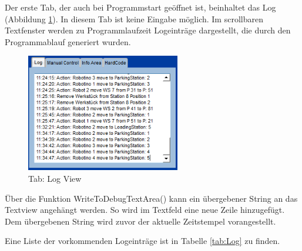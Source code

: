 Der erste Tab, der auch bei Programmstart geöffnet ist, beinhaltet das Log (Abbildung \ref{fig:Log}). In diesem Tab ist keine Eingabe möglich. Im scrollbaren Textfenster werden zu Programmlaufzeit Logeinträge dargestellt, die durch den Programmablauf generiert wurden. 

\begin{figure}[htb]
    \centering
    \includegraphics[width=0.6\textwidth]{Abbildungen/Log.png}
    \caption{Tab: Log View}		
    \label{fig:Log}
\end{figure}

Über die Funktion WriteToDebugTextArea() kann ein übergebener String an das Textview angehängt werden. So wird im Textfeld eine neue Zeile hinzugefügt. Dem übergebenen String wird zuvor der aktuelle Zeitstempel vorangestellt. 

Eine Liste der vorkommenden Logeinträge ist in Tabelle \ref{tab:Log} zu finden. 

